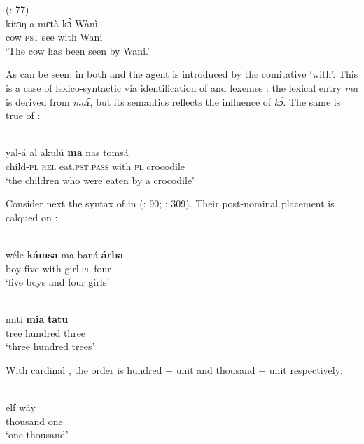 \documentclass[output=paper]{langsci/langscibook}
\begin{document}
\ex
{ (\citealt{BurengVincent1986}: 77)}\\
\gll             kítɜŋ a mɛtà kɔ̀ Wànì\\
                 cow \textsc{pst} see with Wani\\
\glt     `The cow has been seen by Wani.'
\z
\z

As can be seen, in both   and  the agent is introduced by the comitative  ‘with’. This is a case of lexico-syntactic  via identification of  and  lexemes \citep[415]{Manfredi2018}: the   lexical entry \textit{ma} is derived from   \textit{maʕ}, but its semantics reflects the influence of  \textit{kɔ̀}. The same is true of :

\ea
{        \citep[230]{Luffin2005}}\\
\gll yal-á al akulú \textbf{ma} nas tomsá\\
     child-\textsc{pl} \textsc{rel} eat.\textsc{pst.pass} with \textsc{pl} crocodile\\
\glt     `the children who were eaten by a crocodile'
\z

Consider next the syntax of  in  (\citealt{Wellens2003}: 90; \citealt{Luffin2014}: 309). Their post-nominal placement is calqued on :

\ea
{ \citep[309]{Luffin2014}}\\
\gll wéle \textbf{kámsa} ma baná \textbf{árba}\\
     boy five with girl.\textsc{pl} four\\
\glt     `five boys and four girls'
\z

\ea
{ \citep[309]{Luffin2014}}\\
\gll miti \textbf{mia} \textbf{tatu}\\
     tree hundred three\\
\glt     `three hundred trees'
\z

With cardinal , the order is hundred + unit and thousand + unit respectively:

 

 \ea
{ \citep[309]{Luffin2014}}\\

\gll   elf wáy\\
       thousand one\\
\glt      `one thousand'
\z
\end{document}
